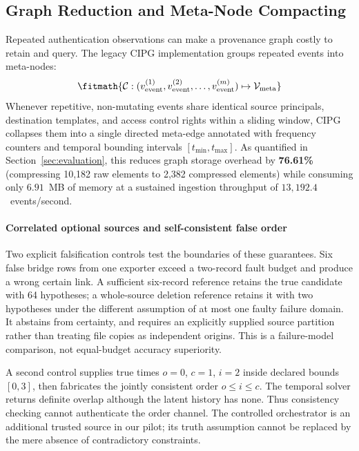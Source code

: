 \subsection{Graph Reduction and Meta-Node Compacting}
Repeated authentication observations can make a provenance graph costly to retain and query. The legacy CIPG implementation groups repeated events into meta-nodes:
\begin{equation}
\fitmath{\mathcal{C}: (v_{\text{event}}^{(1)}, v_{\text{event}}^{(2)}, \dots, v_{\text{event}}^{(m)}) \mapsto \mathcal{V}_{\text{meta}}}
\end{equation}
Whenever repetitive, non-mutating events share identical source principals, destination templates, and access control rights within a sliding window, CIPG collapses them into a single directed meta-edge annotated with frequency counters and temporal bounding intervals $[t_{\min}, t_{\max}]$. As quantified in Section~\ref{sec:evaluation}, this reduces graph storage overhead by \textbf{76.61\%} (compressing 10,182 raw elements to 2,382 compressed elements) while consuming only $6.91$~MB of memory at a sustained ingestion throughput of $13,192.4$~events/second.

\paragraph{Correlated optional sources and self-consistent false order}
Two explicit falsification controls test the boundaries of these guarantees. Six false bridge rows from one exporter exceed a two-record fault budget and produce a wrong certain link. A sufficient six-record reference retains the true candidate with 64 hypotheses; a whole-source deletion reference retains it with two hypotheses under the different assumption of at most one faulty failure domain. It abstains from certainty, and requires an explicitly supplied source partition rather than treating file copies as independent origins. This is a failure-model comparison, not equal-budget accuracy superiority.

A second control supplies true times $o=0$, $c=1$, $i=2$ inside declared bounds $[0,3]$, then fabricates the jointly consistent order $o\le i\le c$. The temporal solver returns definite overlap although the latent history has none. Thus consistency checking cannot authenticate the order channel. The controlled orchestrator is an additional trusted source in our pilot; its truth assumption cannot be replaced by the mere absence of contradictory constraints.
